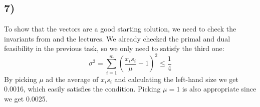 \documentclass[9pt]{IEEEtran}
\begin{document}
\subsection*{7)}
To show that the vectors are a good starting solution, we need to check 
the invariants from \cite{mehlhorn2016still} and the lectures. We already 
checked the primal and dual feasibility in the previous task, so we only need 
to satisfy the third one:
\[
\sigma^2 =\sum_{i=1}^{m} \left( \frac{x_i s_i}{\mu} - 1 \right)^2 \le \frac{1}{4}
\]
By picking $\mu$ ad the average of $x_i s_i$ and calculating the left-hand size we 
get 0.0016, which easily satisfies the condition. Picking $\mu = 1$ is also 
appropriate since we get 0.0025.






  

\end{document}
